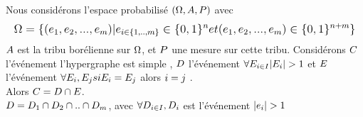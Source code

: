 \documentclass[a4paper,11pt]{article}
\begin{document}
Nous considérons l'espace probabilisé
$\mathlarger{(\Omega,A,P)}$ avec \[\mathlarger{\Omega= \{ (e_{1},e_{2},...,e_{m}) | e_{i \in \{1,..,m\}} \in \{0,1\}^{n} et (e_{1},e_{2},...,e_{m}) \in \{0,1\}^{n+m} \} }\]   $\mathlarger{A}$ est la tribu borélienne sur $\mathlarger{\Omega}$, et $\mathlarger{P}$ une mesure sur cette tribu.
Considérons $\mathlarger{C}$ l'événement \og l'hypergraphe est simple \fg{},  $\mathlarger{D}$ l'événement \og  $\mathlarger{\forall E_{i \in I} |E_{i}|>1}$ \fg{} et  $\mathlarger{E}$ l'événement \og  $\mathlarger{\forall E_{i}, E_{j} si E_{i} = E_{j} }$ alors $\mathlarger{i = j}$ \fg{}.\\
Alors $\mathlarger{C = D \cap E}$. \\
$\mathlarger{D=D_{1} \cap D_{2} \cap .. \cap D_{m}}$, avec   $\mathlarger{ \forall D_{i \in I}, D_{i} }$ est l'événement $\mathlarger{|e_{i}|>1}$ 
  
\end{document}
